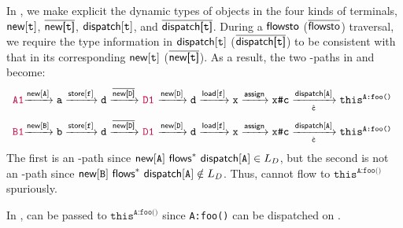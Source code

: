 In  \LF, we make explicit the dynamic types of  objects 
in the  four kinds of terminals, $\textsf{new}[\texttt{t}]$, $\overline{\textsf{new[\texttt{t}]}}$, $\textsf{dispatch}[\texttt{t}]$, and $\overline{\textsf{dispatch[\texttt{t}]}}$. During a
 $\textsf{flowsto}$ ($\overline{\textsf{flowsto}}$) traversal, we require the type information in 
 $\textsf{dispatch}[\texttt{t}]$ ($\overline{\textsf{dispatch[\texttt{t}]}}$) to be consistent with that in
 its corresponding $\textsf{new}[\texttt{t}]$ ($\overline{\textsf{new[\texttt{t}]}}$). As a result, the two
 \manuLFC-paths in  and  become:
\begin{equation*} 
  \centering
\label{eq:newLFCPathCGOnFlyI}
\begin{tabular}{@{\hspace{.5ex}}l} 
\commentfont{A1}$\xrightarrow{\new[\texttt{A}]}  \texttt{a} \xrightarrow{\store[\texttt{f}]} \texttt{d}
\xrightarrow{\inewfield{\texttt{D}}}$ \commentfont{D1} 
$ \xrightarrow{\new[\texttt{D}]} \texttt{d}
\xrightarrow{\load[\texttt{f}]} \texttt{x} \xrightarrow{\assign}\texttt{x\#c}
\xrightarrow[\hat{\mathtt{c}}]{\indispatch[\texttt{A}]} \mathtt{this}^{\texttt{A:foo()}}$
\end{tabular}
\end{equation*}
\begin{equation*} 
  \centering
\label{eq:newLFCPathCGOnFlyII}
\begin{tabular}{@{\hspace{.5ex}}l} 
\commentfont{B1}$\xrightarrow{\new[\texttt{B}]} \texttt{b} \xrightarrow{\store[\texttt{f}]} \texttt{d}
\xrightarrow{\inewfield{\texttt{D}}}$ \commentfont{D1} 
$ \xrightarrow{\new[\texttt{D}]} \texttt{d}
\xrightarrow{\load[\texttt{f}]} \texttt{x} \xrightarrow{\assign}\texttt{x\#c} 
\xrightarrow[\hat{\mathtt{c}}]{\indispatch[\texttt{A}]} \mathtt{this}^{\texttt{A:foo()}}$
\end{tabular}
\end{equation*}
The first is an \LF-path since $\textsf{new}[\texttt{A}] ~ \textsf{flows}^* ~ \textsf{dispatch}[\texttt{A}] \in \mbox{\mbox{${L}_D$}}$,
but the second is not an \LF-path since 
 $\textsf{new}[\texttt{B}] ~ \textsf{flows}^* ~ \textsf{dispatch}[\texttt{A}] \notin \mbox{\mbox{${L}_D$}}$. Thus,
   cannot flow to $\mathtt{this}^{\texttt{A:foo()}}$ spuriously.

In
,  can be passed to 
$\texttt{this}^\texttt{A:foo()}$ since \texttt{A:foo()} can be dispatched
on .


